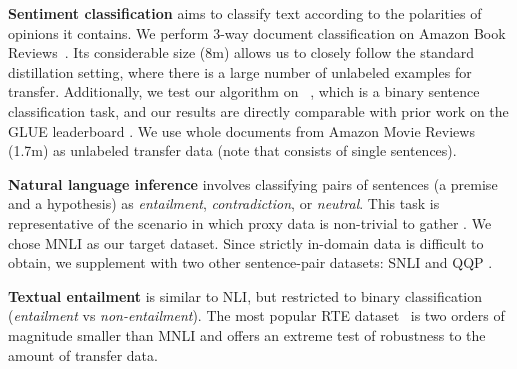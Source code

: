 \textbf{Sentiment classification} aims to classify text according to the polarities of opinions it contains. We perform 3-way document classification on  Amazon  Book  Reviews~\citep{amazon}.
Its considerable size (8m) allows us to closely follow the standard distillation setting, where there is a large number of unlabeled examples for transfer. Additionally, we test our algorithm on \sst~\citep{sst2}, which is a binary sentence classification task, and our results are directly comparable with prior work on the GLUE leaderboard \citep{glue}. We use whole documents from Amazon Movie Reviews (1.7m) as unlabeled transfer data (note that \sst consists of single sentences).

\textbf{Natural language inference} involves classifying pairs of sentences (a premise and a hypothesis) as \emph{entailment}, \emph{contradiction}, or \emph{neutral}. This task is representative of the scenario in which proxy data is non-trivial to gather \citep{nli_artifacts}. We chose MNLI \citep{mnli} as our target dataset. Since strictly in-domain data is difficult to obtain, we supplement \DT with two other sentence-pair datasets: SNLI \citep{snli} and QQP \citep{qqp}.

\textbf{Textual entailment} is similar to NLI, but restricted to binary classification (\emph{entailment} vs \emph{non-entailment}). The most popular RTE dataset~\citep{rte} is two orders of magnitude smaller than MNLI and offers an extreme test of robustness to the amount of transfer data.